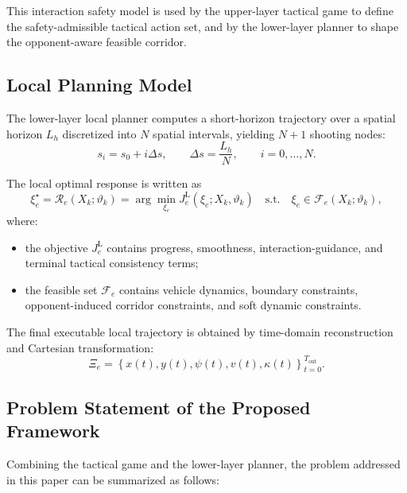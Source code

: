 \documentclass[final ,3p, times]{elsarticle}
\begin{document}
This interaction safety model is used by the upper-layer tactical game to define the safety-admissible tactical action set, and by the lower-layer planner to shape the opponent-aware feasible corridor.

\subsection{Local Planning Model}
\label{subsec:local_planning_model}

The lower-layer local planner computes a short-horizon trajectory over a spatial horizon $L_h$ discretized into $N$ spatial intervals, yielding $N+1$ shooting nodes:
\begin{equation}
s_i = s_0 + i\Delta s,\qquad
\Delta s = \frac{L_h}{N},
\qquad i=0,\dots,N.
\label{eq:planning_grid}
\end{equation}

The local optimal response is written as
\begin{equation}
\xi_e^\star
=
\mathcal{R}_e(X_k;\vartheta_k)
=
\arg\min_{\xi_e}
J_e^{\mathrm{L}}(\xi_e;X_k,\vartheta_k)
\quad
\text{s.t.}
\quad
\xi_e\in\mathcal{F}_e(X_k;\vartheta_k),
\label{eq:local_ocp_modeling}
\end{equation}
where:
\begin{itemize}
    \item the objective $J_e^{\mathrm{L}}$ contains progress, smoothness, interaction-guidance, and terminal tactical consistency terms;
    \item the feasible set $\mathcal{F}_e$ contains vehicle dynamics, boundary constraints, opponent-induced corridor constraints, and soft dynamic constraints.
\end{itemize}

The final executable local trajectory is obtained by time-domain reconstruction and Cartesian transformation:
\begin{equation}
\Xi_e =
\left\{
x(t),y(t),\psi(t),v(t),\kappa(t)
\right\}_{t=0}^{T_{\mathrm{out}}}.
\label{eq:final_trajectory_modeling}
\end{equation}

\subsection{Problem Statement of the Proposed Framework}
\label{subsec:final_problem_statement}

Combining the tactical game and the lower-layer planner, the problem addressed in this paper can be summarized as follows:
\end{document}
